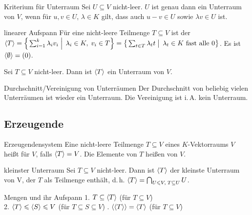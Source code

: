 \begin{Satz}{Kriterium für Unterraum}
    Sei $U \subseteq V$ nicht-leer.
    $U$ ist genau dann ein Unterraum von $V$, wenn für
    $u, v \in U$, $\lambda \in K$ gilt,
    dass auch $u - v \in U$ sowie $\lambda v \in U$ ist.
\end{Satz}

\begin{Def}{linearer Aufspann}
    Für eine nicht-leere Teilmenge $T \subseteq V$ ist der
     \\
    $\langle T \rangle = \left\{\left. \sum_{i=1}^k \lambda_i v_i \;\right|\;
    \lambda_i \in K,\; v_i \in T \right\} =
    \left\{\left. \sum_{t \in T} \lambda_t t \;\right|\;
    \lambda_t \in K \text{ fast alle } 0\right\}$.
    Es ist $\langle \emptyset \rangle = (0)$.
\end{Def}

\begin{Kor}
    Sei $T \subseteq V$ nicht-leer.
    Dann ist $\langle T \rangle$ ein Unterraum von $V$.
\end{Kor}

\begin{Lemma}{Durchschnitt/Vereinigung von Unterräumen}
    Der Durchschnitt von beliebig vielen Unterräumen ist wieder ein Unterraum.
    Die Vereinigung ist i.\,A. kein Unterraum.
\end{Lemma}

\subsection{%
    Erzeugende%
}

\begin{Def}{Erzeugendensystem}
    Eine nicht-leere Teilmenge $T \subseteq V$ eines $K$-Vektorraums $V$ heißt
     für $V$, falls $\langle T \rangle = V$.
    Die Elemente von $T$ heißen  von $V$.
\end{Def}

\begin{Satz}{kleinster Unterraum}
    Sei $T \subseteq V$ nicht-leer.
    Dann ist $\langle T \rangle$ der kleinste Unterraum von V, der $T$ als
    Teilmenge enthält, d.\,h.
    $\langle T \rangle = \bigcap_{U \leqslant V,\; T \subseteq U} U$.
\end{Satz}

\begin{Lemma}{Mengen und ihr Aufspann}
    1. $T \subseteq \langle T \rangle$ \quad (für $T \subseteq V$) \\
    2. $\langle T \rangle \leqslant \langle S \rangle \leqslant V$ \quad
    (für $T \subseteq S \subseteq V$) . $\langle \langle T \rangle \rangle = \langle T \rangle$ \quad (für $T \subseteq V$) 
\end{Lemma}

